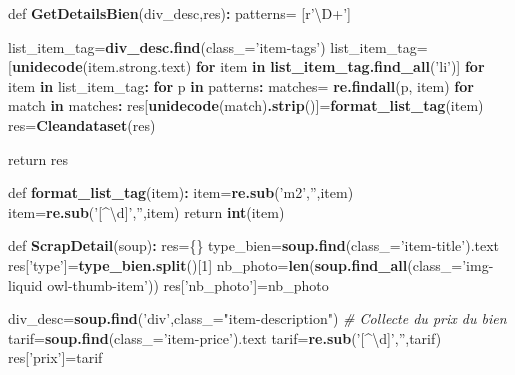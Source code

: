 \documentclass[french,]{article}
\newenvironment{Shaded}{\begin{snugshade}}{\end{snugshade}}
\newcommand{\CommentTok}[1]{\textcolor[rgb]{0.56,0.35,0.01}{\textit{#1}}}
\newcommand{\ControlFlowTok}[1]{\textcolor[rgb]{0.13,0.29,0.53}{\textbf{#1}}}
\newcommand{\DataTypeTok}[1]{\textcolor[rgb]{0.13,0.29,0.53}{#1}}
\newcommand{\DecValTok}[1]{\textcolor[rgb]{0.00,0.00,0.81}{#1}}
\newcommand{\KeywordTok}[1]{\textcolor[rgb]{0.13,0.29,0.53}{\textbf{#1}}}
\newcommand{\NormalTok}[1]{#1}
\newcommand{\OperatorTok}[1]{\textcolor[rgb]{0.81,0.36,0.00}{\textbf{#1}}}
\newcommand{\StringTok}[1]{\textcolor[rgb]{0.31,0.60,0.02}{#1}}
\begin{document}
\begin{Shaded}
\begin{Highlighting}[]
\NormalTok{def }\KeywordTok{GetDetailsBien}\NormalTok{(div_desc,res)}\OperatorTok{:}
\StringTok{    }\NormalTok{patterns=}\StringTok{ }\NormalTok{[r}\StringTok{'\textbackslash{}D+'}\NormalTok{]}
    
\NormalTok{    list_item_tag=}\KeywordTok{div_desc.find}\NormalTok{(}\DataTypeTok{class_=}\StringTok{'item-tags'}\NormalTok{)}
\NormalTok{    list_item_tag=[}\KeywordTok{unidecode}\NormalTok{(item.strong.text) }\ControlFlowTok{for}\NormalTok{ item }\ControlFlowTok{in} \KeywordTok{list_item_tag.find_all}\NormalTok{(}\StringTok{'li'}\NormalTok{)]}
    \ControlFlowTok{for}\NormalTok{ item }\ControlFlowTok{in}\NormalTok{ list_item_tag}\OperatorTok{:}\StringTok{     }
\StringTok{        }\ControlFlowTok{for}\NormalTok{ p }\ControlFlowTok{in}\NormalTok{ patterns}\OperatorTok{:}
\StringTok{            }\NormalTok{matches=}\StringTok{ }\KeywordTok{re.findall}\NormalTok{(p, item)}
        \ControlFlowTok{for}\NormalTok{ match }\ControlFlowTok{in}\NormalTok{ matches}\OperatorTok{:}
\StringTok{            }\NormalTok{res[}\KeywordTok{unidecode}\NormalTok{(match)}\KeywordTok{.strip}\NormalTok{()]=}\KeywordTok{format_list_tag}\NormalTok{(item)}
\NormalTok{    res=}\KeywordTok{Cleandataset}\NormalTok{(res)}

\NormalTok{    return res}


\NormalTok{def }\KeywordTok{format_list_tag}\NormalTok{(item)}\OperatorTok{:}
\StringTok{    }\NormalTok{item=}\KeywordTok{re.sub}\NormalTok{(}\StringTok{'m2'}\NormalTok{,}\StringTok{''}\NormalTok{,item)}
\NormalTok{    item=}\KeywordTok{re.sub}\NormalTok{(}\StringTok{'[^\textbackslash{}d]'}\NormalTok{,}\StringTok{''}\NormalTok{,item)}
\NormalTok{    return }\KeywordTok{int}\NormalTok{(item)}

\NormalTok{def }\KeywordTok{ScrapDetail}\NormalTok{(soup)}\OperatorTok{:}
\StringTok{    }\NormalTok{res=\{\}}
\NormalTok{    type_bien=}\KeywordTok{soup.find}\NormalTok{(}\DataTypeTok{class_=}\StringTok{'item-title'}\NormalTok{).text}
\NormalTok{    res[}\StringTok{'type'}\NormalTok{]=}\KeywordTok{type_bien.split}\NormalTok{()[}\DecValTok{1}\NormalTok{]}
\NormalTok{    nb_photo=}\KeywordTok{len}\NormalTok{(}\KeywordTok{soup.find_all}\NormalTok{(}\DataTypeTok{class_=}\StringTok{'img-liquid owl-thumb-item'}\NormalTok{))}
\NormalTok{    res[}\StringTok{'nb_photo'}\NormalTok{]=nb_photo}
    
\NormalTok{    div_desc=}\KeywordTok{soup.find}\NormalTok{(}\StringTok{'div'}\NormalTok{,}\DataTypeTok{class_=}\StringTok{"item-description"}\NormalTok{)}
\CommentTok{#   Collecte du prix du bien}
\NormalTok{    tarif=}\KeywordTok{soup.find}\NormalTok{(}\DataTypeTok{class_=}\StringTok{'item-price'}\NormalTok{).text}
\NormalTok{    tarif=}\KeywordTok{re.sub}\NormalTok{(}\StringTok{'[^\textbackslash{}d]'}\NormalTok{,}\StringTok{''}\NormalTok{,tarif)}
\NormalTok{    res[}\StringTok{'prix'}\NormalTok{]=tarif}
    

\end{Highlighting}
\end{Shaded}
\end{document}
